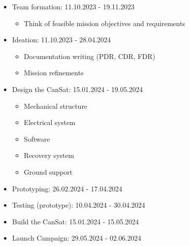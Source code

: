 \begin{itemize}[leftmargin=1cm, itemindent=0.25cm, noitemsep, topsep=0pt, label=$\bullet$]
\item Team formation: 11.10.2023 - 19.11.2023
\begin{multicols}{2}[\vspace{-0.75\baselineskip}]
\begin{itemize}[label=, noitemsep, topsep=2pt]
\item Think of feasible mission objectives and requirements
\end{itemize}
\end{multicols}
\vspace*{-0.75\baselineskip}
\item Ideation: 11.10.2023 - 28.04.2024
\begin{multicols}{2}[\vspace{-0.75\baselineskip}]
\begin{itemize}[label=, noitemsep, topsep=2pt]
\item Documentation writing (PDR, CDR, FDR)
\item Mission refinements
\end{itemize}
\end{multicols}
\vspace*{-0.75\baselineskip}
\item Design the CanSat: 15.01.2024 - 19.05.2024
\begin{multicols}{2}[\vspace{-0.75\baselineskip}]
\begin{itemize}[label=, noitemsep, topsep=2pt]
\item Mechanical structure 
\item Electrical system
\item Software
\item Recovery system
\item Ground support
\end{itemize}
\end{multicols}
\vspace*{-0.75\baselineskip}
\item Prototyping: 26.02.2024 - 17.04.2024
\item Testing (prototype): 10.04.2024 - 30.04.2024
\item Build the CanSat: 15.01.2024 - 15.05.2024
\item Launch Campaign: 29.05.2024 - 02.06.2024
\end{itemize}

